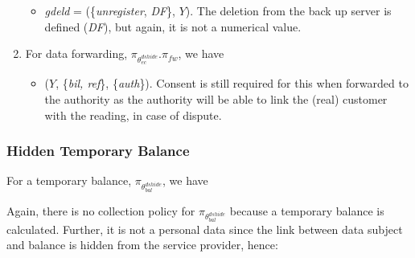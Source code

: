 \documentclass[a4paper]{article}
\begin{document}
\begin{enumerate}
\begin{itemize}
\item \textit{gdeld} = (\{\textit{unregister}, \textit{DF}\}, $Y$).     The deletion from the back up server is defined (\textit{DF}), but again, it is not a numerical value.  
\end{itemize}   

\item For data forwarding, $\pi_{\theta^{dshide}_{ec}}$.$\pi_{fw}$, we have  

\begin{itemize}
\item ($Y$, \{\textit{bil, ref}\}, \{\textit{auth}\}). Consent is still required for this when forwarded to the authority as the authority will be able to link the (real) customer with the reading, in case of dispute.    
\end{itemize}   

\end{enumerate} 


\subsubsection{Hidden Temporary Balance} 
For a temporary balance, $\pi_{\theta^{dshide}_{bal}}$, we have 

\begin{center}
\noindent{}
\end{center} 

Again, there is no collection policy for $\pi_{\theta^{dshide}_{bal}}$ because a temporary balance is calculated. Further, it is not a personal data since the link between data subject and balance is hidden from the service provider, hence: 
\end{document}
